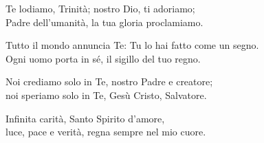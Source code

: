 
\strofa Te lodiamo, Trinità; nostro Dio, ti adoriamo;\\
Padre dell'umanità, la tua gloria proclamiamo.

\spazio


\spazio

\strofa Tutto il mondo annuncia Te: Tu lo hai fatto come un segno.\\
Ogni uomo porta in sé, il sigillo del tuo regno.

\spazio


\spazio

\strofa Noi crediamo solo in Te, nostro Padre e creatore;\\
noi speriamo solo in Te, Gesù Cristo, Salvatore.

\spazio


\spazio

\strofa Infinita carità, Santo Spirito d'amore,\\
luce, pace e verità, regna sempre nel mio cuore.

\spazio

